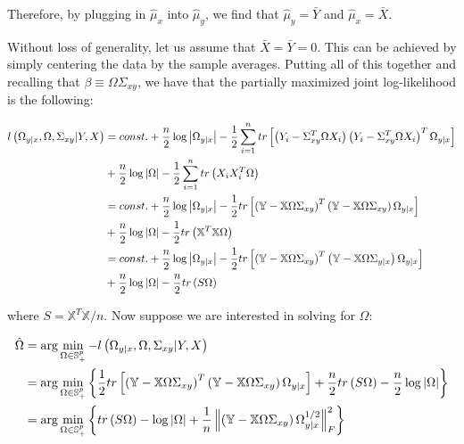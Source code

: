 \documentclass[11pt,]{report}
\begin{document}
Therefore, by plugging in \(\hat{\mu}_{x}\) into \(\hat{\mu}_{y}\), we find that \(\hat{\mu}_{y} = \bar{Y}\) and \(\hat{\mu}_{x} = \bar{X}\).

Without loss of generality, let us assume that \(\bar{X} = \bar{Y} = 0\). This can be achieved by simply centering the data by the sample averages. Putting all of this together and recalling that \(\beta \equiv \Omega\Sigma_{xy}\), we have that the partially maximized joint log-likelihood is the following:

\begin{equation}
\begin{split}
  l\left( \Omega_{y | x}, \Omega, \Sigma_{xy} | Y, X \right) &= const. + \frac{n}{2}\log\left| \Omega_{y | x} \right| - \frac{1}{2}\sum_{i = 1}^{n} tr\left[ \left( Y_{i} - \Sigma_{xy}^{T}\Omega X_{i} \right)\left( Y_{i} - \Sigma_{xy}^{T}\Omega X_{i} \right)^{T}\Omega_{y | x} \right] \\
  &+\frac{n}{2}\log\left| \Omega \right| - \frac{1}{2}\sum_{i = 1}^{n}tr\left( X_{i}X_{i}^{T}\Omega \right) \\
  &= const. + \frac{n}{2}\log\left| \Omega_{y | x} \right| - \frac{1}{2}tr\left[ \left( \mathbb{Y} - \mathbb{X}\Omega\Sigma_{xy} \right)^{T}\left( \mathbb{Y} - \mathbb{X}\Omega\Sigma_{xy} \right)\Omega_{y | x} \right] \\
  &+ \frac{n}{2}\log\left| \Omega \right| - \frac{1}{2}tr\left( \mathbb{X}^{T}\mathbb{X}\Omega \right) \\
  &= const. + \frac{n}{2}\log\left| \Omega_{y | x} \right| - \frac{1}{2}tr\left[ \left( \mathbb{Y} - \mathbb{X}\Omega\Sigma_{xy} \right)^{T}\left( \mathbb{Y} - \mathbb{X}\Omega\Sigma_{y | x} \right)\Omega_{y | x} \right] \\
  &+ \frac{n}{2}\log\left| \Omega \right| - \frac{n}{2}tr\left( S\Omega \right)
\label{eq:partialjointloglik}\notag
\end{split}
\end{equation}

where \(S = \mathbb{X}^{T}\mathbb{X}/n\). Now suppose we are interested in solving for \(\Omega\):

\begin{equation}
\begin{split}
  \hat{\Omega} &= \arg\min_{\Omega \in \mathbb{S}_{+}^{p}}-l\left( \Omega_{y | x}, \Omega, \Sigma_{xy} | Y, X \right) \\
  &= \arg\min_{\Omega \in \mathbb{S}_{+}^{p}}\left\{ \frac{1}{2}tr\left[ \left( \mathbb{Y} - \mathbb{X}\Omega\Sigma_{xy} \right)^{T}\left( \mathbb{Y} - \mathbb{X}\Omega\Sigma_{xy} \right)\Omega_{y | x} \right] + \frac{n}{2}tr\left( S\Omega \right) - \frac{n}{2}\log\left| \Omega \right| \right\} \\
  &= \arg\min_{\Omega \in \mathbb{S}_{+}^{p}}\left\{ tr\left( S\Omega \right) - \log\left| \Omega \right| + \frac{1}{n}\left\| \left( \mathbb{Y} - \mathbb{X}\Omega\Sigma_{xy} \right)\Omega_{y | x}^{1/2} \right\|_{F}^{2} \right\}
\label{eq:omegajointloglik}\notag
\end{split}
\end{equation}
\end{document}
